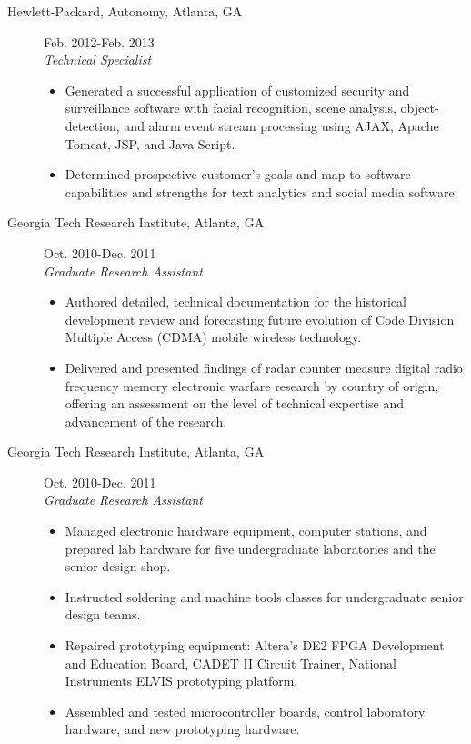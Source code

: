 \documentclass{res}
\begin{document}
\begin{resume}
\begin{description}
   		\item[{Hewlett-Packard, Autonomy}, Atlanta, GA]\hfill Feb. 2012-Feb. 2013\\\textit{Technical Specialist}
   		\vspace{-0.1in}
   		\begin{itemize}
   			\item Generated a successful application of customized security and surveillance software with facial recognition, scene analysis, object-detection, and alarm event stream processing using AJAX, Apache Tomcat, JSP, and Java Script.
   			\item Determined prospective customer's goals and map to software capabilities and strengths for text analytics and social media software. 
   		\end{itemize}
   		\pagebreak
   		\item[{Georgia Tech Research Institute}, Atlanta, GA]\hfill Oct. 2010-Dec. 2011\\\textit{Graduate Research Assistant}
   		\vspace{-0.1in}
   		\begin{itemize}
   			\item Authored detailed, technical documentation for the historical development review and forecasting future evolution of Code Division Multiple Access (CDMA) mobile wireless technology. 
   			\item Delivered and presented findings of radar counter measure digital radio frequency memory electronic warfare research by country of origin, offering an assessment on the level of technical expertise and advancement of the research.
   		\end{itemize}
   		\item[{Georgia Tech Research Institute}, Atlanta, GA]\hfill Oct. 2010-Dec. 2011\\\textit{Graduate Research Assistant}
   		\vspace{-0.1in}
   		\begin{itemize}
   			\item Managed electronic hardware equipment, computer stations, and prepared lab hardware for five undergraduate laboratories and the senior design shop. 
   			\item Instructed soldering and machine tools classes for undergraduate senior design teams.
   			\item Repaired prototyping equipment: Altera’s DE2 FPGA Development and Education Board, CADET II Circuit Trainer, National Instruments ELVIS prototyping platform. 
   			\item Assembled and tested microcontroller boards, control laboratory hardware, and new prototyping hardware.
   		\end{itemize}
   	\end{description}
 

\end{resume}
\end{document}
